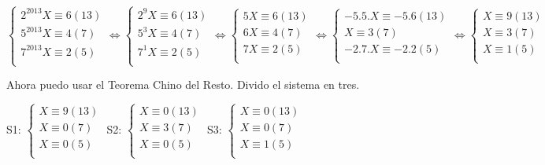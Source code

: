 $ \begin{cases}
    2^{2013}X \equiv 6(13) \\
    5^{2013}X \equiv 4(7) \\
    7^{2013}X \equiv 2(5) \\
\end{cases} 
\iff \begin{cases}
    2^{9}X \equiv 6(13) \\
    5^{3}X \equiv 4(7) \\
    7^{1}X \equiv 2(5) \\
\end{cases}
\iff \begin{cases}
    5X \equiv 6(13) \\
    6X \equiv 4(7) \\
    7X \equiv 2(5) \\
\end{cases} 
\iff \begin{cases}
    -5.5.X \equiv -5.6(13) \\
    X \equiv 3(7) \\
    -2.7.X \equiv -2.2(5) \\
\end{cases}
\iff \begin{cases}
    X \equiv 9(13) \\
    X \equiv 3(7) \\
    X \equiv 1(5) \\
\end{cases} $

Ahora puedo usar el Teorema Chino del Resto. Divido el sistema en tres.

S1: $ \begin{cases}
    X \equiv 9(13) \\
    X \equiv 0(7) \\
    X \equiv 0(5) \\
\end{cases} $
S2: $ \begin{cases}
    X \equiv 0(13) \\
    X \equiv 3(7) \\
    X \equiv 0(5) \\
\end{cases} $
S3: $ \begin{cases}
    X \equiv 0(13) \\
    X \equiv 0(7) \\
    X \equiv 1(5) \\
\end{cases} $ 

